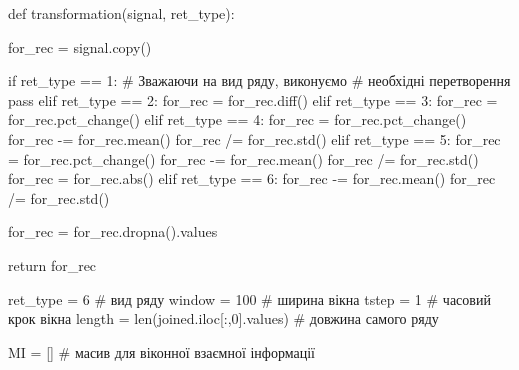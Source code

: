 \documentclass[
  letterpaper,
]{report}
\newenvironment{Shaded}{\begin{snugshade}}{\end{snugshade}}
\newcommand{\BuiltInTok}[1]{\textcolor[rgb]{0.00,0.23,0.31}{#1}}
\newcommand{\CommentTok}[1]{\textcolor[rgb]{0.37,0.37,0.37}{#1}}
\newcommand{\ControlFlowTok}[1]{\textcolor[rgb]{0.00,0.23,0.31}{#1}}
\newcommand{\DecValTok}[1]{\textcolor[rgb]{0.68,0.00,0.00}{#1}}
\newcommand{\KeywordTok}[1]{\textcolor[rgb]{0.00,0.23,0.31}{#1}}
\newcommand{\NormalTok}[1]{\textcolor[rgb]{0.00,0.23,0.31}{#1}}
\newcommand{\OperatorTok}[1]{\textcolor[rgb]{0.37,0.37,0.37}{#1}}
\begin{document}
\begin{Shaded}
\begin{Highlighting}[]
\KeywordTok{def}\NormalTok{ transformation(signal, ret\_type):}

\NormalTok{    for\_rec }\OperatorTok{=}\NormalTok{ signal.copy()}

    \ControlFlowTok{if}\NormalTok{ ret\_type }\OperatorTok{==} \DecValTok{1}\NormalTok{:       }\CommentTok{\# Зважаючи на вид ряду, виконуємо}
                            \CommentTok{\# необхідні перетворення}
        \ControlFlowTok{pass}
    \ControlFlowTok{elif}\NormalTok{ ret\_type }\OperatorTok{==} \DecValTok{2}\NormalTok{:}
\NormalTok{        for\_rec }\OperatorTok{=}\NormalTok{ for\_rec.diff()}
    \ControlFlowTok{elif}\NormalTok{ ret\_type }\OperatorTok{==} \DecValTok{3}\NormalTok{:}
\NormalTok{        for\_rec }\OperatorTok{=}\NormalTok{ for\_rec.pct\_change()}
    \ControlFlowTok{elif}\NormalTok{ ret\_type }\OperatorTok{==} \DecValTok{4}\NormalTok{:}
\NormalTok{        for\_rec }\OperatorTok{=}\NormalTok{ for\_rec.pct\_change()}
\NormalTok{        for\_rec }\OperatorTok{{-}=}\NormalTok{ for\_rec.mean()}
\NormalTok{        for\_rec }\OperatorTok{/=}\NormalTok{ for\_rec.std()}
    \ControlFlowTok{elif}\NormalTok{ ret\_type }\OperatorTok{==} \DecValTok{5}\NormalTok{: }
\NormalTok{        for\_rec }\OperatorTok{=}\NormalTok{ for\_rec.pct\_change()}
\NormalTok{        for\_rec }\OperatorTok{{-}=}\NormalTok{ for\_rec.mean()}
\NormalTok{        for\_rec }\OperatorTok{/=}\NormalTok{ for\_rec.std()}
\NormalTok{        for\_rec }\OperatorTok{=}\NormalTok{ for\_rec.}\BuiltInTok{abs}\NormalTok{()}
    \ControlFlowTok{elif}\NormalTok{ ret\_type }\OperatorTok{==} \DecValTok{6}\NormalTok{:}
\NormalTok{        for\_rec }\OperatorTok{{-}=}\NormalTok{ for\_rec.mean()}
\NormalTok{        for\_rec }\OperatorTok{/=}\NormalTok{ for\_rec.std()}

\NormalTok{    for\_rec }\OperatorTok{=}\NormalTok{ for\_rec.dropna().values}

    \ControlFlowTok{return}\NormalTok{ for\_rec}
\end{Highlighting}
\end{Shaded}

\begin{Shaded}
\begin{Highlighting}[]
\NormalTok{ret\_type }\OperatorTok{=} \DecValTok{6}                           \CommentTok{\# вид ряду}
\NormalTok{window }\OperatorTok{=} \DecValTok{100}                           \CommentTok{\# ширина вікна}
\NormalTok{tstep }\OperatorTok{=} \DecValTok{1}                              \CommentTok{\# часовий крок вікна }
\NormalTok{length }\OperatorTok{=} \BuiltInTok{len}\NormalTok{(joined.iloc[:,}\DecValTok{0}\NormalTok{].values)  }\CommentTok{\# довжина самого ряду}

\NormalTok{MI }\OperatorTok{=}\NormalTok{ []                                }\CommentTok{\# масив для віконної взаємної інформації}
\end{Highlighting}
\end{Shaded}
\end{document}

